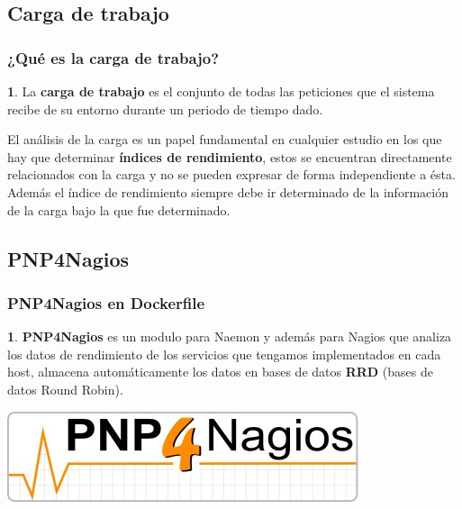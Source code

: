 \documentclass{beamer}
\theoremstyle{plain}
\theoremstyle{definition}
\newtheorem{defn}[thm]{}
\theoremstyle{plain}
\theoremstyle{definition}
\theoremstyle{remark}
\theoremstyle{definition}
\begin{document}
\subsection{Carga de trabajo}
\begin{frame}
	\frametitle{¿Qué es la carga de trabajo?}
	\begin{defn}
		La \textbf{carga de trabajo} es el conjunto de todas las peticiones que el sistema recibe de su entorno
		durante un periodo de tiempo dado.
	\end{defn}
El análisis de la carga es un papel fundamental en cualquier
estudio en los que hay que determinar \textbf{índices de rendimiento}, estos se
encuentran directamente relacionados con la carga y no se pueden expresar
de forma independiente a ésta. Además el índice de rendimiento siempre debe
ir determinado de la información de la carga bajo la que fue determinado.
	
\end{frame}
\subsection{PNP4Nagios}

\begin{frame}
	\frametitle{PNP4Nagios en Dockerfile}
	\begin{defn}
		\textbf{PNP4Nagios} es un modulo para Naemon y además para
		Nagios que analiza los datos de rendimiento de los servicios que tengamos implementados en cada host, almacena automáticamente los datos en bases	de datos \textbf{RRD} (bases de datos Round Robin).
	\end{defn}
	\begin{center}
		\includegraphics[scale=0.8]{imagenes/Pnp4nagios_logo.jpg}
	\end{center}

\end{frame}
\end{document}
